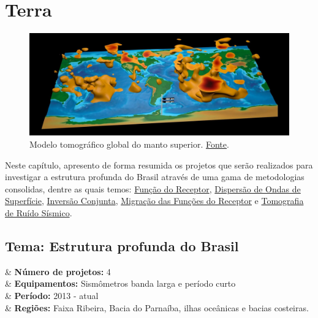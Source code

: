 \documentclass[10pt,a4paper,oneside]{book}
\newcommand{\HeroFigPad}{\vspace{-1cm}}
\begin{document}
\bigskip


\chapter{Terra}
\label{cap_terra}

\begin{figure}[h]
	\HeroFigPad
	\begin{center}
		\includegraphics[width=\textwidth]{images/globe_structure.jpg}
	\end{center}
	\caption{
	Modelo tomográfico global do manto superior. \href{https://www.olcf.ornl.gov/2017/03/28/a-seismic-mapping-milestone/}{Fonte}.
    }
 \label{fig_structure}
\end{figure}

Neste capítulo, apresento de forma resumida os projetos que serão realizados para investigar a estrutura profunda do Brasil através de uma gama de metodologias consolidas, dentre as quais temos: \href{https://doi.org/10.1029/JB084iB09p04749}{Função do Receptor}, \href{https://doi.org/10.1111/j.1365-246X.1990.tb04573.x}{Dispersão de Ondas de Superfície}, \href{https://doi.org/10.1046/j.1365-246x.2000.00217.x}{Inversão Conjunta}, \href{https://doi.org/10.1016/j.epsl.2013.08.025}{Migração das Funções do Receptor} e \href{https://doi.org/10.1111/j.1365-246X.2007.03374.x}{Tomografia de Ruído Sísmico}.   

\section{Tema: Estrutura profunda do Brasil}

\begin{summarybox}[frametitle=\faProjectDiagram{}\quad Panorama da linha de pesquisa]
	\begin{datelist}
		\faFile* & \textbf{Número de projetos:} 4 \\
		\faBinoculars & \textbf{Equipamentos:} Sismômetros banda larga e período curto \\
		\faCalendar*[regular] & \textbf{Período:} 2013 - atual \\
		\faMapMarked* & \textbf{Regiões:} Faixa Ribeira, Bacia do Parnaíba, ilhas oceânicas e bacias costeiras. \\
	\end{datelist}
\end{summarybox}
\end{document}
